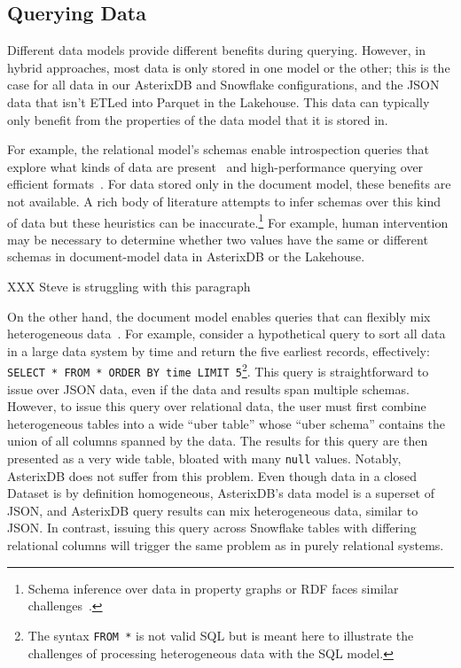 \vspace{-0.8em}
\subsection{Querying Data} \label{ss:hybrid_querying}

Different data models provide different benefits during querying. However, in hybrid approaches, most data is only stored in one model or the other; this is the case for all data in our AsterixDB and Snowflake configurations, and the JSON data that isn't ETLed into Parquet in the Lakehouse. This data can typically only benefit from the properties of the data model that it is stored in.

For example, the relational model's schemas enable introspection queries that explore what kinds of data are present~\cite{aurum} and high-performance querying over efficient formats~\cite{snowflake, parquet, dremel, cstore}. For data stored only in the document model, these benefits are not available.
A rich body of literature attempts to infer schemas over this kind of data but these heuristics can be inaccurate.\footnote{Schema inference over data in property graphs or RDF faces similar challenges~\cite{deriving_rdf_schema, neo4j}.} For example, human intervention may be necessary to determine whether two values have the same or different schemas in document-model data in AsterixDB or the Lakehouse.

XXX Steve is struggling with this paragraph 

On the other hand, the document model enables queries that can flexibly mix heterogeneous data~\cite{lorel, asterixdb}. For example, consider a hypothetical query to sort all data in a large data system by time and return the five earliest records, effectively: \texttt{SELECT * FROM * ORDER BY time LIMIT 5}\footnote{The syntax \texttt{FROM *} is not valid SQL but is meant here to illustrate the challenges of processing heterogeneous data with the SQL model.}. This query is straightforward to issue over JSON data, even if the data and results span multiple schemas. However, to issue this query over relational data, the user must first combine heterogeneous tables into a wide ``uber table'' whose ``uber schema'' contains the union of all columns spanned by the data. The results for this query are then presented as a very wide table, bloated with many \texttt{null} values. Notably, AsterixDB does not suffer from this problem. Even though data in a closed Dataset is by definition homogeneous, AsterixDB's data model is a superset of JSON, and AsterixDB query results can mix heterogeneous data, similar to JSON. In contrast, issuing this query across Snowflake tables with differing relational columns will trigger the same problem as in purely relational systems.

